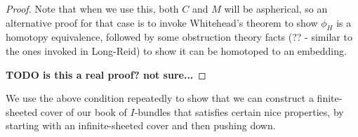 {\begin{proof}

Note that when we use this, both $C$ and $M$ will be aspherical, so an
alternative proof for that case is to invoke Whitehead's theorem to show
$\phi_H$ is a homotopy equivalence, followed by some obstruction theory facts
(??  - similar to the ones invoked in Long-Reid) to show it can be homotoped to
an embedding.

\textbf{ TODO is this a real proof? not sure...}

%
%

%
%

\end{proof}

We use the above condition repeatedly to show that we can construct
a finite-sheeted cover of our book of $I$-bundles that satisfies certain nice
properties, by starting with an infinite-sheeted cover and then pushing down.

}
